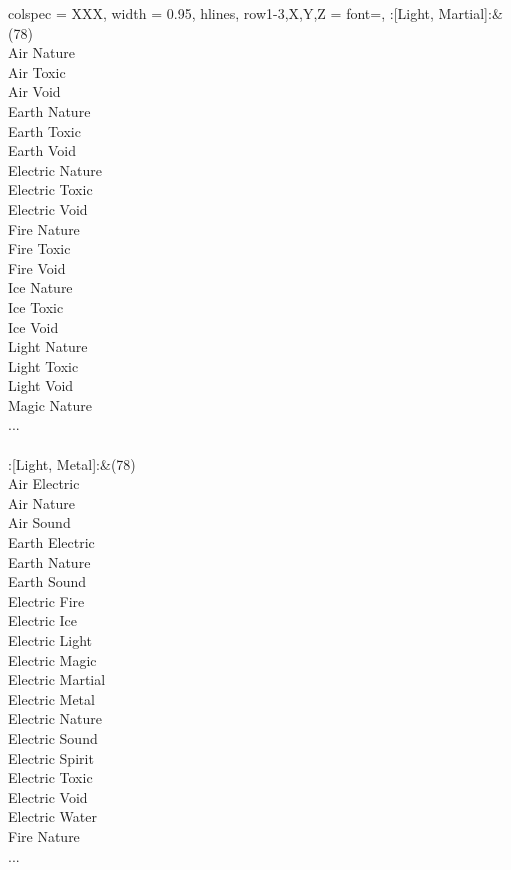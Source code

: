 \begin{longtblr}[
	caption = {2v2 Defending Weak},
	label = {2v2-Defending-Weak},
]{
	colspec = {XXX}, width = 0.95\linewidth,
	hlines,
	row{1-3,X,Y,Z} = {font=\bfseries},
}
	:[Light, Martial]:&{(78)\\
	Air Nature \\
	Air Toxic \\
	Air Void \\
	Earth Nature \\
	Earth Toxic \\
	Earth Void \\
	Electric Nature \\
	Electric Toxic \\
	Electric Void \\
	Fire Nature \\
	Fire Toxic \\
	Fire Void \\
	Ice Nature \\
	Ice Toxic \\
	Ice Void \\
	Light Nature \\
	Light Toxic \\
	Light Void \\
	Magic Nature \\
	...\\
	}\\

	:[Light, Metal]:&{(78)\\
	Air Electric \\
	Air Nature \\
	Air Sound \\
	Earth Electric \\
	Earth Nature \\
	Earth Sound \\
	Electric Fire \\
	Electric Ice \\
	Electric Light \\
	Electric Magic \\
	Electric Martial \\
	Electric Metal \\
	Electric Nature \\
	Electric Sound \\
	Electric Spirit \\
	Electric Toxic \\
	Electric Void \\
	Electric Water \\
	Fire Nature \\
	...\\
	}\\


\end{longtblr}
